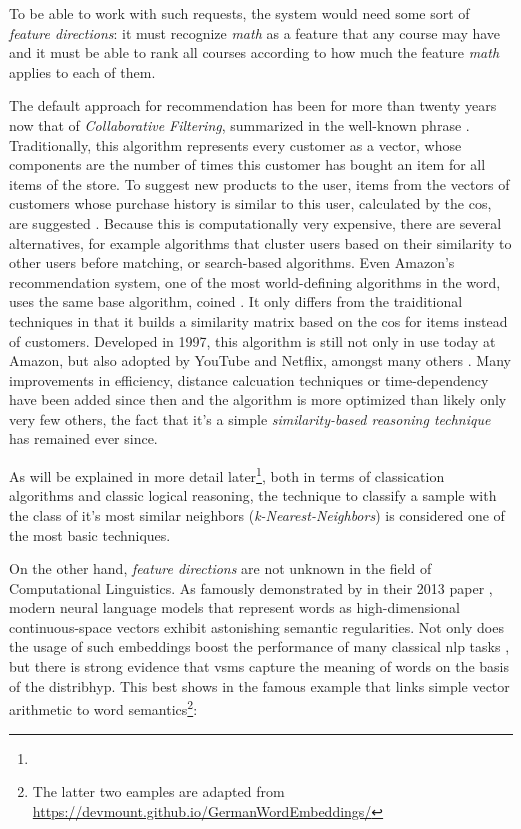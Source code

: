 To be able to work with such requests, the system would need some sort of \textit{feature directions}: it must recognize \emph{math} as a feature that any course may have and it must be able to rank all courses according to how much the feature \emph{math} applies to each of them.


The default approach for recommendation has been for more than twenty years now that of \emph{Collaborative Filtering}, summarized in the well-known phrase  \cite{Sarwar2000}. Traditionally, this algorithm represents every customer as a vector, whose components are the number of times this customer has bought an item for all items of the store. To suggest new products to the user, items from the vectors of customers whose purchase history is similar to this user, calculated by \eg the \gls{cos}, are suggested \cite{Linden2003}. Because this is computationally very expensive, there are several alternatives, for example algorithms that cluster users based on their similarity to other users before matching, or search-based algorithms. Even Amazon's recommendation system, one of the most world-defining algorithms in the word, uses the same base algorithm, coined . It only differs from the traiditional techniques in that it builds a similarity matrix based on the \gls{cos} for items instead of customers. Developed in 1997, this algorithm is still not only in use today at Amazon, but also adopted by YouTube and Netflix, amongst many others \cite{Smith2017}. Many improvements in efficiency, distance calcuation techniques or time-dependency have been added since then and the algorithm is more optimized than likely only very few others, the fact that it's a simple \textit{similarity-based reasoning technique} has remained ever since. 

As will be explained in more detail later\footnote{}, both in terms of classication algorithms and classic logical reasoning, the technique to classify a sample with the class of it's most similar neighbors (\emph{k-Nearest-Neighbors}) is considered one of the most basic techniques.

On the other hand, \textit{feature directions} are not unknown in the field of Computational Linguistics. As famously demonstrated by \textcite{Mikolov:Regularities} in their 2013 paper , modern neural language models that represent words as high-dimensional continuous-space vectors exhibit astonishing semantic regularities. Not only does the usage of such embeddings boost the performance of many classical \gls{nlp} tasks \cite{Mikolov2013a,Le2014, Devlin2019}, but there is strong evidence that \glspl{vsm} capture the meaning of words on the basis of the \gls{distribhyp}. This best shows in the famous example that links simple vector arithmetic to word semantics\footnote{The latter two eamples are adapted from \url{https://devmount.github.io/GermanWordEmbeddings/}}:

